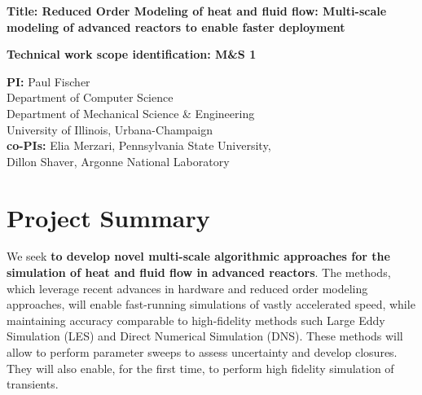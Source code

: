 \parindent 0in
\parskip 0.1in

{\bf Title:  Reduced Order Modeling of heat and fluid flow: Multi-scale
modeling of advanced reactors to enable faster deployment}

{\bf Technical work scope identification: M\&S 1 }

{\bf PI:}
Paul Fischer \\
Department of Computer Science \\
Department of Mechanical Science \& Engineering \\
University of Illinois, Urbana-Champaign \\

{\bf co-PIs:}
Elia Merzari, Pennsylvania State University, \\
Dillon Shaver, Argonne National Laboratory \\

\section{Project Summary}


We seek \textbf{to develop novel multi-scale algorithmic approaches for the
simulation of heat and fluid flow in advanced reactors}. The methods, which
leverage recent advances in hardware and reduced order modeling approaches,
will enable fast-running simulations of vastly accelerated speed, while
maintaining accuracy comparable to high-fidelity methods such Large Eddy
Simulation (LES) and Direct Numerical Simulation (DNS). These methods will
allow to perform
parameter sweeps to assess uncertainty and develop closures. They will also
enable, for the first time, to perform high fidelity simulation of transients.

